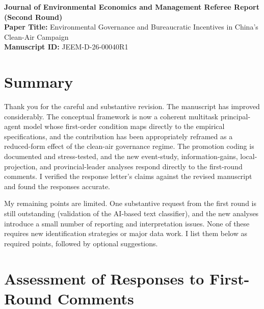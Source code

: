 \documentclass[12pt]{article}
\begin{document}
\begin{center}
    \Large \textbf{Journal of Environmental Economics and Management Referee Report (Second Round)}\\[1ex]
    \large \textbf{Paper Title:} Environmental Governance and Bureaucratic Incentives in China's Clean-Air Campaign\\
    \large \textbf{Manuscript ID:} JEEM-D-26-00040R1
\end{center}

\section{Summary}

Thank you for the careful and substantive revision. The manuscript has improved considerably. The conceptual framework is now a coherent multitask principal-agent model whose first-order condition maps directly to the empirical specifications, and the contribution has been appropriately reframed as a reduced-form effect of the clean-air governance regime. The promotion coding is documented and stress-tested, and the new event-study, information-gains, local-projection, and provincial-leader analyses respond directly to the first-round comments. I verified the response letter's claims against the revised manuscript and found the responses accurate.

My remaining points are limited. One substantive request from the first round is still outstanding (validation of the AI-based text classifier), and the new analyses introduce a small number of reporting and interpretation issues. None of these requires new identification strategies or major data work. I list them below as required points, followed by optional suggestions.

\section{Assessment of Responses to First-Round Comments}
\end{document}
